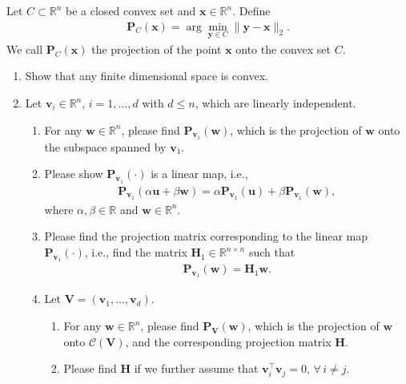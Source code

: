 \documentclass[11pt,letter,notitlepage]{article}
\newcommand{\proj}[2]{\textbf{P}_{#2} (#1)}
\begin{document}
\begin{exercise}
	Let $C \subset \mathbb{R}^n$ be a closed convex set and $\mathbf{x} \in \mathbb{R}^n$. Define
	\begin{align*}
	    \proj{\mathbf{x}}{C} = \arg\min_{\mathbf{y} \in C}\| \mathbf{y} - \mathbf{x} \|_2.    
	\end{align*}
    We call $\proj{\mathbf{x}}{C}$ the projection of the point $\mathbf{x}$ onto the convex set $C$. 
    \begin{enumerate}
        \item Show that any finite dimensional space is convex.
        \item Let $\mathbf{v}_i \in \mathbb{R}^n$, $i=1,\ldots,d$ with $d\leq n$, which are linearly independent.
            \begin{enumerate}
		        \item For any $\mathbf{w}\in \mathbb{R}^n$, please find $\proj{\mathbf{w}}{\mathbf{v}_1}$, which is the projection of $\mathbf{w}$ onto the subspace spanned by $\mathbf{v}_1$.  
		        \item Please show $\proj{\cdot}{\mathbf{v}_1}$ is a linear map, i.e.,
		            \begin{align*}
		                \proj{\alpha\mathbf{u}+\beta\mathbf{w}}{\mathbf{v}_1}=\alpha\proj{\mathbf{u}}{\mathbf{v}_1} + \beta \proj{\mathbf{w}}{\mathbf{v}_1},
		            \end{align*}
		            where $\alpha,\beta\in\mathbb{R}$ and $\mathbf{w}\in\mathbb{R}^n$.
		        \item Please find the projection matrix corresponding to the linear map $\proj{\cdot}{\mathbf{v}_1}$, i.e., find the matrix $\mathbf{H}_1\in\mathbb{R}^{n\times n}$ such that
		            \begin{align*}
		                \proj{\mathbf{w}}{\mathbf{v}_1}=\mathbf{H}_1\mathbf{w}.
		            \end{align*}
		        \item Let $\mathbf{V}=(\mathbf{v}_1,\ldots,\mathbf{v}_d)$. 
		            \begin{enumerate}
		                \item For any $\mathbf{w}\in \mathbb{R}^n$, please find              $\proj{\mathbf{w}}{\mathbf{V}}$, which is the projection of $\mathbf{w}$ onto $\mathcal{C}(\mathbf{V})$, and the corresponding projection matrix $\mathbf{H}$. 
		                \item Please find $\mathbf{H}$ if we further assume that $\mathbf{v}_i^{\top}\mathbf{v}_j=0$, $\forall\,i\neq j$.

\end{enumerate}
\end{enumerate}
\end{enumerate}
\end{exercise}
\end{document}

